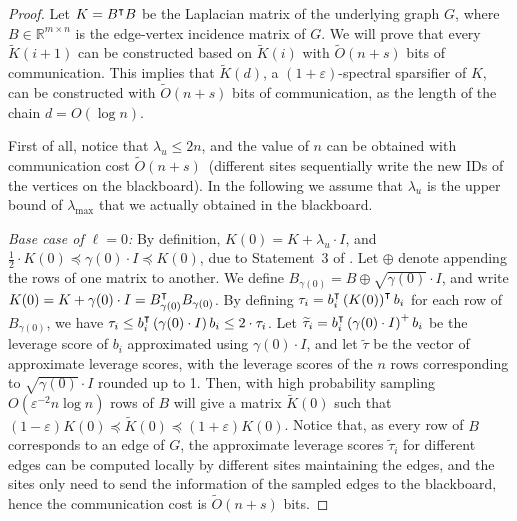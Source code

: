 \begin{proof} Let $K= B^{\intercal}B$  be the Laplacian matrix of the underlying graph $G$, where $B\in\mathbb{R}^{m\times n}$ is the  edge-vertex incidence matrix of $G$. We will  prove  that 
 every $\tilde{K}(i+1)$ can be constructed based on $\tilde{K}(i)$ with  $\tilde{O}(n+s)$ bits of communication. This implies that $\tilde{K}(d)$, a $(1+\varepsilon)$-spectral sparsifier of $K$, can be constructed with $\tilde{O}(n+s)$ bits of communication, as the length of the chain $d=O(\log n)$.  
 
 
 First of all, notice that  $\lambda_u\leq 2n$, and the value of $n$ can be obtained with communication cost $\tilde{O}(n+s)$~(different sites sequentially write the new IDs of the vertices on the blackboard). In the following  we assume that $\lambda_u$ is the upper bound of $\lambda_{\max}$ that we actually obtained in the blackboard.
 
\emph{Base case of $\ell=0$:} 
 By definition, $K(0)=K+\lambda_u\cdot  I$, and 
$
 \frac{1}{2}\cdot K(0)\preceq \gamma(0)\cdot I \preceq K(0)$, 
due to Statement~3 of  .  Let $\oplus$ denote appending the rows of one matrix to another. We define $B_{\gamma(0)}=B\oplus \sqrt{\gamma(0)}\cdot I$, and write $K(0)=K+\gamma(0)\cdot I=B^{\intercal}_{\gamma(0)}B_{\gamma(0)}$. By defining $\tau_i=b_i^{\intercal}\left(K(0)\right)^{\intercal}b_i$ for each row of $B_{\gamma(0)}$, we have
$
\tau_i\leq b_i^{\intercal}\left(\gamma(0)\cdot I\right) b_i\leq 2\cdot \tau_i$.
Let $\widetilde{\tau}_i=b_i^{\intercal}\left( \gamma(0)\cdot I \right)^{+}b_i$ be the leverage score of $b_i$ approximated using $\gamma(0)\cdot I$, and let $\tilde{\tau}$ be the vector of approximate leverage scores, with the leverage scores of the $n$ rows corresponding to $\sqrt{\gamma(0)}\cdot I$ rounded up to 1. Then, with high probability sampling $O(\varepsilon^{-2}n\log n)$ rows of $B$ will give a matrix $\tilde{K}(0)$ such that $
(1-\varepsilon)K(0)\preceq \tilde{K}(0)\preceq (1+\varepsilon)K(0)$.
Notice that, as every row of $B$ corresponds to an edge of $G$, the approximate leverage scores $\tilde{\tau}_i$ for different edges can be computed locally by different sites maintaining the edges, and the sites only need to send the information of the sampled edges to the blackboard, hence the communication cost is $\tilde{O}(n+s)$ bits.


\end{proof}

